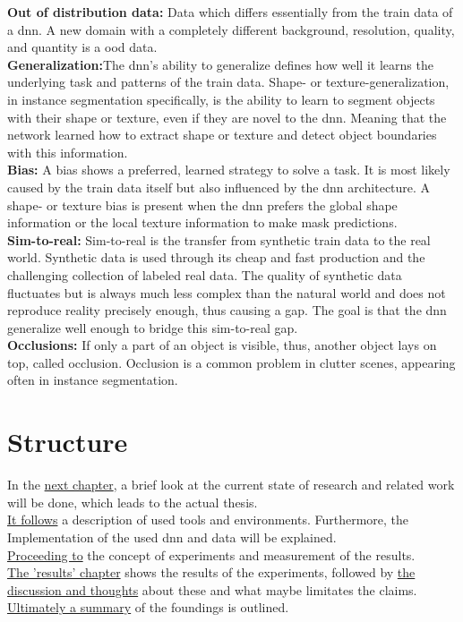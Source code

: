 		\textbf{Out of distribution data:} Data which differs essentially from the train data of a \ac{dnn}. A new domain with a completely different background, resolution, quality, and quantity is a \ac{ood} data.\\
		\textbf{Generalization:}The \ac{dnn}'s ability to generalize defines how well it learns the underlying task and patterns of the train data. Shape- or texture-generalization, in instance segmentation specifically, is the ability to learn to segment objects with their shape or texture, even if they are novel to the \ac{dnn}. Meaning that the network learned how to extract shape or texture and detect object boundaries with this information. \\
		\textbf{Bias:} A bias shows a preferred, learned strategy to solve a task. It is most likely caused by the train data itself but also influenced by the \ac{dnn} architecture. A shape- or texture bias is present when the \ac{dnn} prefers the global shape information or the local texture information to make mask predictions.\\
		\textbf{Sim-to-real:} Sim-to-real is the transfer from synthetic train data to the real world. Synthetic data is used through its cheap and fast production and the challenging collection of labeled real data. The quality of synthetic data fluctuates but is always much less complex than the natural world and does not reproduce reality precisely enough, thus causing a gap. The goal is that the \ac{dnn} generalize well enough to bridge this sim-to-real gap.\\
		\textbf{Occlusions:} If only a part of an object is visible, thus, another object lays on top, called occlusion. Occlusion is a common problem in clutter scenes, appearing often in instance segmentation.
		
	
	
	\section{Structure}
	\label{sec:structure}
		In the \hyperref[chap:kapitel2]{next chapter}, a brief look at the current state of research and related work will be done, which leads to the actual thesis.\\
		\hyperref[chap:kapitel3]{It follows} a description of used tools and environments. Furthermore, the Implementation of the used \ac{dnn} and data will be explained.\\
		\hyperref[chap:kapitel4]{Proceeding to} the concept of experiments and measurement of the results.\\
		\hyperref[chap:kapitel5]{The 'results' chapter} shows the results of the experiments, followed by \hyperref[chap:kapitel6]{the discussion and thoughts} about these and what maybe limitates the claims.\\
		\hyperref[chap:kapitel7]{Ultimately a summary} of the foundings is outlined.
		





